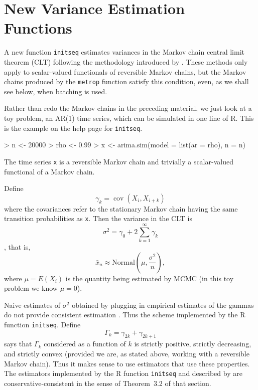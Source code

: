 \documentclass{article}
\DeclareMathOperator{\cov}{cov}
\begin{document}
\section{New Variance Estimation Functions}

A new function \texttt{initseq} estimates variances in the Markov chain
central limit theorem (CLT) following the methodology introduced by
\citet[Section~3.3]{practical}.  These methods only apply to scalar-valued
functionals of
reversible Markov chains, but the Markov chains produced by the \texttt{metrop}
function satisfy this condition, even, as we shall see below, when batching
is used.

Rather than redo the Markov chains in the preceding material, we just look
at a toy problem, an AR(1) time series, which can be simulated in one line
of R.  This is the example on the help page for \texttt{initseq}.
\begin{Schunk}
\begin{Sinput}
> n <- 20000
> rho <- 0.99
> x <- arima.sim(model = list(ar = rho), n = n)
\end{Sinput}
\end{Schunk}
The time series \texttt{x} is a reversible Markov chain and trivially
a scalar-valued functional of a Markov chain.

Define
\begin{equation} \label{eq:little}
   \gamma_k = \cov(X_i, X_{i + k})
\end{equation}
where the covariances refer to the stationary Markov chain having the
same transition probabilities as \texttt{x}.  Then the variance in the CLT
is
$$
   \sigma^2 = \gamma_0 + 2 \sum_{k = 1}^\infty \gamma_k
$$
\citep[Theorem~2.1]{practical}, that is,
$$
   \bar{x}_n \approx \text{Normal}\left(\mu, \frac{\sigma^2}{n}\right),
$$
where $\mu = E(X_i)$ is the quantity being estimated by MCMC (in this
toy problem we know $\mu = 0$).

Naive estimates of $\sigma^2$ obtained by plugging in empirical
estimates of the gammas do not provide consistent estimation
\citep[Section~3.1]{practical}.  Thus the scheme implemented
by the R function \texttt{initseq}.  Define
\begin{equation} \label{eq:big}
   \Gamma_k = \gamma_{2 k} + \gamma_{2 k + 1}
\end{equation}
\citet[Theorem~3.1]{practical} says that $\Gamma_k$ considered as a function
of $k$ is strictly positive, strictly decreasing, and strictly convex
(provided we are, as stated above, working with a reversible Markov chain).
Thus it makes sense to use estimators that use these properties.
The estimators implemented by the R function \texttt{initseq} and
described by \citet[Section~3.3]{practical} are conservative-consistent
in the sense of Theorem~3.2 of that section.
\end{document}
